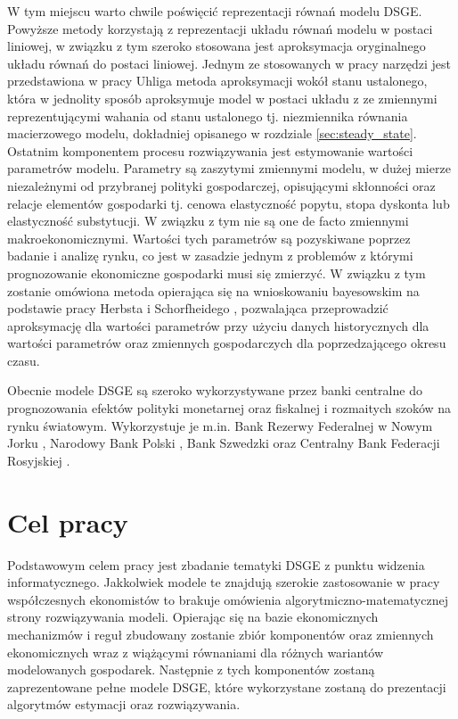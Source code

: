 W tym miejscu warto chwile poświęcić reprezentacji równań modelu DSGE. Powyższe metody korzystają z reprezentacji układu równań modelu w postaci liniowej, w związku z tym szeroko stosowana jest aproksymacja oryginalnego układu równań do postaci liniowej. Jednym ze stosowanych w pracy narzędzi jest przedstawiona w pracy Uhliga\cite{uhlig:1995} metoda aproksymacji wokół stanu ustalonego, która w jednolity sposób aproksymuje model w postaci układu z ze zmiennymi reprezentującymi wahania od stanu ustalonego tj. niezmiennika równania macierzowego modelu, dokładniej opisanego w rozdziale \ref{sec:steady_state}. Ostatnim komponentem procesu rozwiązywania jest estymowanie wartości parametrów modelu. Parametry są zaszytymi zmiennymi modelu, w dużej mierze niezależnymi od przybranej polityki gospodarczej, opisującymi skłonności oraz relacje elementów gospodarki tj. cenowa elastyczność popytu, stopa dyskonta lub elastyczność substytucji. W związku z tym nie są one de facto zmiennymi makroekonomicznymi. Wartości tych parametrów są pozyskiwane poprzez badanie i analizę rynku, co jest w zasadzie jednym z problemów z którymi prognozowanie ekonomiczne gospodarki musi się zmierzyć. W związku z tym zostanie omówiona metoda opierająca się na wnioskowaniu bayesowskim na podstawie pracy Herbsta i Schorfheidego \cite{herbst}, pozwalająca przeprowadzić aproksymację dla wartości parametrów przy użyciu danych historycznych dla wartości parametrów oraz zmiennych gospodarczych dla poprzedzającego okresu czasu.

Obecnie modele DSGE są szeroko wykorzystywane przez banki centralne do prognozowania efektów polityki monetarnej oraz fiskalnej i rozmaitych szoków na rynku światowym. Wykorzystuje je m.in. Bank Rezerwy Federalnej w Nowym Jorku \cite{del2013frbny}, Narodowy Bank Polski \cite{nbpKoloch}, Bank Szwedzki  \cite{dsgeSweden} oraz Centralny Bank Federacji Rosyjskiej \cite{dsgeRussia}.

\section*{Cel pracy}

Podstawowym celem pracy jest zbadanie tematyki DSGE z punktu widzenia informatycznego. Jakkolwiek modele te znajdują szerokie zastosowanie w pracy współczesnych ekonomistów to brakuje omówienia algorytmiczno-matematycznej strony rozwiązywania modeli. Opierając się na bazie ekonomicznych mechanizmów i reguł zbudowany zostanie zbiór komponentów oraz zmiennych ekonomicznych wraz z wiążącymi równaniami dla różnych wariantów modelowanych gospodarek. Następnie z tych komponentów zostaną zaprezentowane pełne modele DSGE, które wykorzystane zostaną do prezentacji algorytmów estymacji oraz rozwiązywania.


